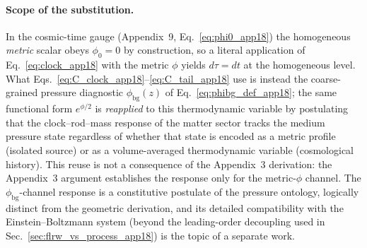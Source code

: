 \documentclass[11pt]{article}
\begin{document}
\paragraph{Scope of the substitution.}
In the cosmic-time gauge (Appendix~9, Eq.~\ref{eq:phi0_app18}) the
homogeneous \emph{metric} scalar obeys $\phi_0=0$ by construction, so a
literal application of Eq.~\eqref{eq:clock_app18} with the metric
$\phi$ yields $d\tau=dt$ at the homogeneous level.  What
Eqs.~\eqref{eq:C_clock_app18}--\eqref{eq:C_tail_app18} use is instead
the coarse-grained pressure diagnostic $\phi_{\mathrm{bg}}(z)$ of
Eq.~\eqref{eq:phibg_def_app18}; the same functional form
$e^{\phi/2}$ is \emph{reapplied} to this thermodynamic variable by
postulating that the clock--rod--mass response of the matter sector
tracks the medium pressure state regardless of whether that state is
encoded as a metric profile (isolated source) or as a volume-averaged
thermodynamic variable (cosmological history).  This reuse is not a
consequence of the Appendix~3 derivation: the Appendix~3 argument
establishes the response only for the metric-$\phi$ channel.  The
$\phi_{\mathrm{bg}}$-channel response is a constitutive postulate of
the pressure ontology, logically distinct from the geometric
derivation, and its detailed compatibility with the Einstein--Boltzmann
system (beyond the leading-order decoupling used in
Sec.~\ref{sec:flrw_vs_process_app18}) is the topic of a separate work.
\end{document}
